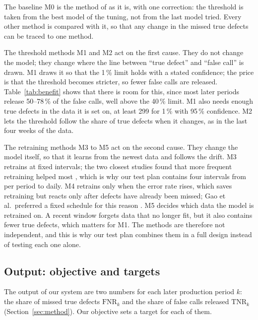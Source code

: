 \documentclass[11pt,a4paper]{article}
\begin{document}
The baseline M0 is the method of \cite{pfab2025} as it is, with one correction: the threshold is taken from the best model of the tuning, not from the last model tried. Every other method is compared with it, so that any change in the missed true defects can be traced to one method.

The threshold methods M1 and M2 act on the first cause. They do not change the model; they change where the line between ``true defect'' and ``false call'' is drawn. M1 draws it so that the 1\,\% limit holds with a stated confidence; the price is that the threshold becomes stricter, so fewer false calls are released. Table~\ref{tab:benefit} shows that there is room for this, since most later periods release 50--78\,\% of the false calls, well above the 40\,\% limit. M1 also needs enough true defects in the data it is set on, at least 299 for 1\,\% with 95\,\% confidence. M2 lets the threshold follow the share of true defects when it changes, as in the last four weeks of the data.

The retraining methods M3 to M5 act on the second cause. They change the model itself, so that it learns from the newest data and follows the drift. M3 retrains at fixed intervals; the two closest studies found that more frequent retraining helped most \cite{dalpozzolo2018,gao2026}, which is why our test plan contains four intervals from per period to daily. M4 retrains only when the error rate rises, which saves retraining but reacts only after defects have already been missed; Gao et al.\ preferred a fixed schedule for this reason \cite{gao2026}. M5 decides which data the model is retrained on. A recent window forgets data that no longer fit, but it also contains fewer true defects, which matters for M1. The methods are therefore not independent, and this is why our test plan combines them in a full design instead of testing each one alone.

\subsection{Output: objective and targets}
\label{sec:output}
The output of our system are two numbers for each later production period $k$: the share of missed true defects $\mathrm{FNR}_k$ and the share of false calls released $\mathrm{TNR}_k$ (Section~\ref{sec:method}). Our objective sets a target for each of them.
\end{document}
